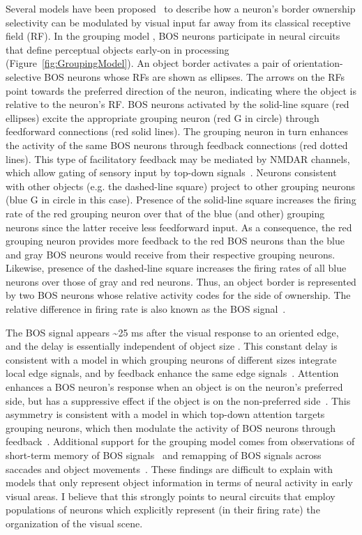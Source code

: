 Several models have been proposed~\citep{Zhaoping05, Sakai_Nishimura06,Craft_etal07, Layton_etal12} to describe how a neuron's border ownership selectivity can be modulated by visual input far away from its classical receptive field (RF). In the grouping model
\citep{Craft_etal07}, BOS neurons participate in neural circuits that define perceptual objects early-on in processing (Figure~\ref{fig:GroupingModel}). An object border activates a pair of orientation-selective BOS neurons whose RFs are shown as ellipses. The arrows on the RFs point towards the preferred direction of the neuron, indicating where the object is relative to the neuron's RF. BOS neurons activated by the solid-line square (red ellipses) excite the appropriate grouping neuron (red G in circle) through feedforward connections (red solid lines). The grouping neuron in turn enhances the activity of the same BOS neurons through feedback connections (red dotted lines). This type of facilitatory feedback may be mediated by NMDAR channels, which allow gating of sensory input by top-down signals~\citep{Palmer_etal14}. Neurons consistent with other objects (e.g. the dashed-line square) project to other grouping neurons (blue G in circle in this case). Presence of the solid-line square increases the firing rate of the red grouping neuron over that of the blue (and other) grouping neurons since the latter receive less feedforward input. As a consequence, the red grouping neuron provides more feedback to the red BOS neurons than the blue and gray BOS neurons would receive from their respective grouping neurons. Likewise, presence of the dashed-line square increases the firing rates of all blue neurons over those of gray and red neurons. Thus, an object border is represented by two BOS neurons whose relative activity codes for the side of ownership. The relative difference in firing rate is also known as the BOS signal~\citep{Zhou_etal00}.

The BOS signal appears \textasciitilde 25 ms after the visual response
to an oriented edge, and the delay is essentially independent of object size \citep{Zhou_etal00}. This constant delay is consistent with a model in which grouping neurons of different sizes integrate local edge signals, and by feedback enhance the same edge
 signals~\citep{Craft_etal07}. Attention enhances a BOS neuron's
 response when an object is on the neuron's preferred side, but has a
 suppressive effect if the object is on the non-preferred
 side~\citep{Qiu_etal07}. This asymmetry is consistent with a model in
 which top-down attention targets grouping neurons, which then modulate
 the activity of BOS neurons through feedback~\citep{Mihalas_etal11b}. Additional support for the grouping model comes from observations of short-term memory of BOS signals~\citep{OHerron_vonderHeydt09} and remapping of BOS signals across saccades and object movements~\citep{OHerron_vonderHeydt13}. These findings are difficult
 to explain with models that only represent object information in terms
 of neural activity in early visual areas. I believe that this strongly
 points to neural circuits that employ populations of neurons which
 explicitly represent (\ie in their firing rate) the organization of
 the visual scene.

